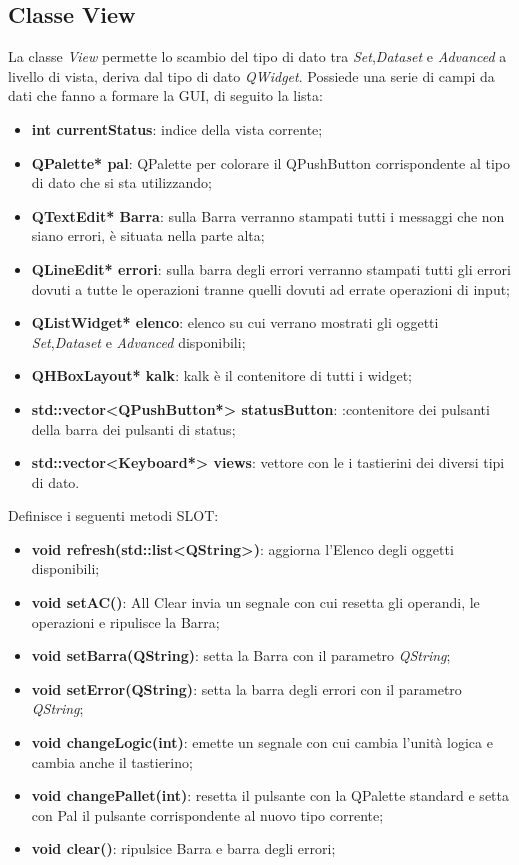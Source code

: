 \documentclass[a4paper,10pt]{article}
\begin{document}
            \subsection{Classe View}
            La classe \textit{View} permette lo scambio del tipo di dato tra \textit{Set},\textit{Dataset} e \textit{Advanced} a livello di vista, deriva dal tipo di dato \textit{QWidget}.
            Possiede una serie di campi da dati che fanno a formare la GUI, di seguito la lista:
            \begin{itemize}
                \item \textbf{int currentStatus}: indice della vista corrente;
                \item \textbf{QPalette* pal}: QPalette per colorare il QPushButton corrispondente al tipo di dato che si sta utilizzando;
                \item \textbf{QTextEdit* Barra}: sulla Barra verranno stampati tutti i messaggi che non siano errori, è situata nella parte alta;
                \item \textbf{QLineEdit* errori}: sulla barra degli errori verranno stampati tutti gli errori dovuti a tutte le operazioni tranne quelli dovuti ad errate operazioni di input;
                \item \textbf{QListWidget* elenco}: elenco su cui verrano mostrati gli oggetti \textit{Set},\textit{Dataset} e \textit{Advanced} disponibili;
                \item \textbf{QHBoxLayout* kalk}: kalk è il contenitore di tutti i widget;
                \item \textbf{std::vector<QPushButton*> statusButton}: :contenitore dei pulsanti della barra dei pulsanti di status;
                \item \textbf{std::vector<Keyboard*> views}: vettore con le i tastierini dei diversi tipi di dato.
            \end{itemize}
            Definisce i seguenti metodi SLOT:
            \begin{itemize}
                \item \textbf{void refresh(std::list<QString>)}: aggiorna l'Elenco degli oggetti disponibili;
                \item \textbf{void setAC()}: All Clear invia un segnale con cui resetta gli operandi, le operazioni e ripulisce la Barra;
                \item \textbf{void setBarra(QString)}: setta la Barra con il parametro \textit{QString};
                \item \textbf{void setError(QString)}: setta la barra degli errori con il parametro \textit{QString};
                \item \textbf{void changeLogic(int)}: emette un segnale con cui cambia l'unità logica e cambia anche il tastierino;
                \item \textbf{void changePallet(int)}: resetta il pulsante con la QPalette standard e setta con Pal il pulsante corrispondente al nuovo tipo corrente;
                \item \textbf{void clear()}: ripulsice Barra e barra degli errori;
            \end{itemize}
\end{document}
